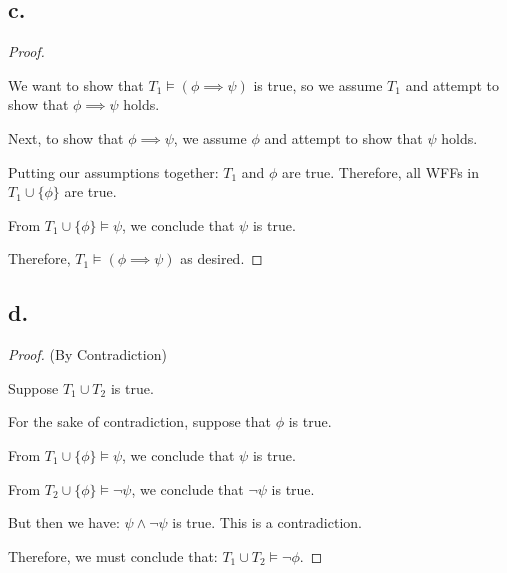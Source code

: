 \documentclass{article}
\begin{document}
\subsection*{c.}
\begin{proof}
  $ $

  We want to show that $T_1 \models (\phi \implies \psi)$ is true, so we assume $T_1$ and attempt to show that $\phi \implies \psi$ holds.

  Next, to show that $\phi \implies \psi$, we assume $\phi$ and attempt to show that $\psi$ holds.

  Putting our assumptions together: $T_1$ and $\phi$ are true. Therefore, all WFFs in $T_1 \cup \{ \phi \}$ are true.

  From $T_1 \cup \{ \phi \} \models \psi$, we conclude that $\psi$ is true.

  Therefore, $T_1 \models (\phi \implies \psi)$ as desired.

\end{proof}

\subsection*{d.}
\begin{proof}(By Contradiction)
  $ $

  Suppose $T_1 \cup T_2$ is true.

  For the sake of contradiction, suppose that $\phi$ is true.

  From $T_1 \cup \{ \phi \} \models \psi$, we conclude that $\psi$ is true.

  From $T_2 \cup \{ \phi \} \models \lnot \psi$, we conclude that $\lnot \psi$ is true.

  But then we have: $\psi \land \lnot \psi$ is true. This is a contradiction.

  Therefore, we must conclude that: $T_1 \cup T_2 \models \lnot \phi$.

\end{proof}
\end{document}
